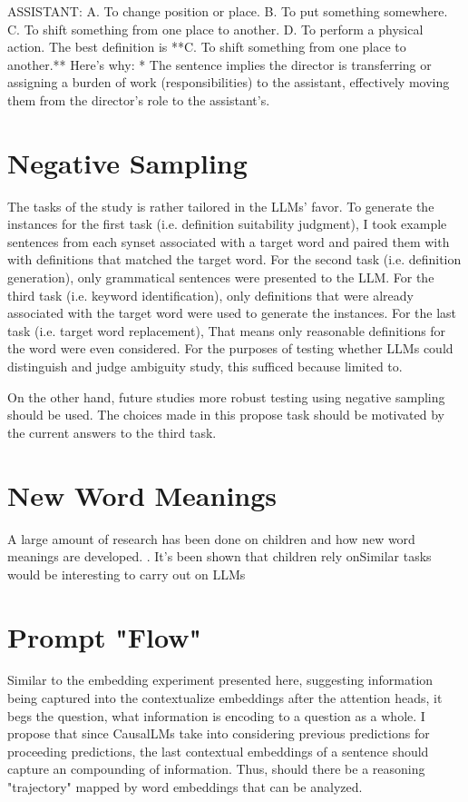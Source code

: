\documentclass{brandeis-thesis3.2}
\theoremstyle{plain}
\theoremstyle{definition}
\theoremstyle{remark}
\numberwithin{equation}{section}
\renewcommand\cite{\citep}
\begin{document}
ASSISTANT: A. To change position or place. B. To put something somewhere. C. To shift something from one place to another. D. To perform a physical action. The best definition is **C. To shift something from one place to another.** Here's why: * The sentence implies the director is transferring or assigning a burden of work (responsibilities) to the assistant, effectively moving them from the director's role to the assistant's.

\section{Negative Sampling}
The tasks of the study is rather tailored in the LLMs' favor. To generate the instances for the first task (i.e. definition suitability judgment), I took example sentences from each synset associated with a target word and paired them with with definitions that matched the target word. For the second task (i.e. definition generation), only grammatical sentences were presented to the LLM.  %
For the third task (i.e. keyword identification), only definitions that were already associated with the target word were used to generate the instances.  %
For the last task (i.e. target word replacement), %
That means only reasonable definitions for the word were even considered. For the purposes of testing whether LLMs could distinguish and judge ambiguity study, this sufficed because  limited to.

On the other hand, future studies more robust testing using negative sampling should be used. The choices made in this propose task should be motivated by the current answers to the third task.

\section{New Word Meanings}
A large amount of research has been done on children and how new word meanings are developed. \cite{srinivasan_children_2019}. It's been shown that children rely onSimilar tasks would be interesting to carry out on LLMs

\section{Prompt "Flow"}
Similar to the embedding experiment presented here, suggesting information being captured into the contextualize embeddings after the attention heads, it begs the question, what information is encoding to a question as a whole. I propose that since CausalLMs take into considering previous predictions for proceeding predictions, the last contextual embeddings of a sentence should capture an compounding of information. Thus, should there be a reasoning "trajectory" mapped by word embeddings that can be analyzed. 
\end{document}
